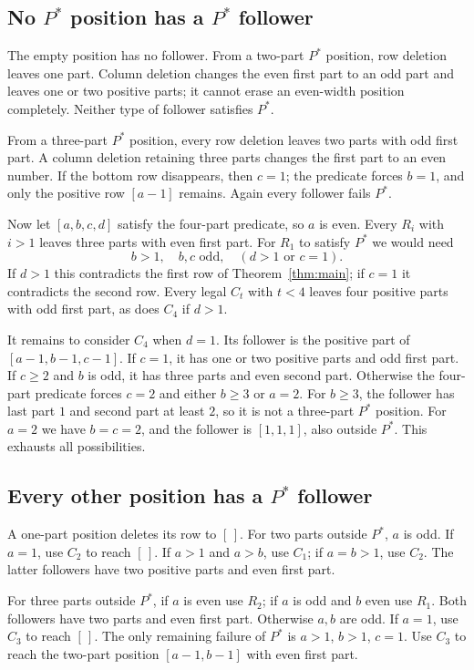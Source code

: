 \documentclass[11pt]{article}
\begin{document}
\subsection{No $P^*$ position has a $P^*$ follower}
The empty position has no follower.
From a two-part $P^*$ position, row deletion leaves one part.
Column deletion changes the even first part to an odd part and leaves one
or two positive parts; it cannot erase an even-width position completely.
Neither type of follower satisfies $P^*$.

From a three-part $P^*$ position, every row deletion leaves two parts
with odd first part. A column deletion retaining three parts changes the
first part to an even number. If the bottom row disappears, then $c=1$;
the predicate forces $b=1$, and only the positive row $[a-1]$ remains.
Again every follower fails $P^*$.

Now let $[a,b,c,d]$ satisfy the four-part predicate, so $a$ is even.
Every $R_i$ with $i>1$ leaves three parts with even first part.
For $R_1$ to satisfy $P^*$ we would need
\[
 b>1,\quad b,c\text{ odd},\quad (d>1\text{ or }c=1).
\]
If $d>1$ this contradicts the first row of Theorem~\ref{thm:main};
if $c=1$ it contradicts the second row.
Every legal $C_t$ with $t<4$ leaves four positive parts with odd first
part, as does $C_4$ if $d>1$.

It remains to consider $C_4$ when $d=1$.
Its follower is the positive part of $[a-1,b-1,c-1]$.
If $c=1$, it has one or two positive parts and odd first part.
If $c\ge2$ and $b$ is odd, it has three parts and even second part.
Otherwise the four-part predicate forces $c=2$ and either $b\ge3$ or
$a=2$. For $b\ge3$, the follower has last part $1$ and second part
at least $2$, so it is not a three-part $P^*$ position.
For $a=2$ we have $b=c=2$, and the follower is $[1,1,1]$,
also outside $P^*$.
This exhausts all possibilities.

\subsection{Every other position has a $P^*$ follower}
A one-part position deletes its row to $[\,]$.
For two parts outside $P^*$, $a$ is odd.
If $a=1$, use $C_2$ to reach $[\,]$.
If $a>1$ and $a>b$, use $C_1$; if $a=b>1$, use $C_2$.
The latter followers have two positive parts and even first part.

For three parts outside $P^*$, if $a$ is even use $R_2$;
if $a$ is odd and $b$ even use $R_1$.
Both followers have two parts and even first part.
Otherwise $a,b$ are odd.
If $a=1$, use $C_3$ to reach $[\,]$.
The only remaining failure of $P^*$ is $a>1$, $b>1$, $c=1$.
Use $C_3$ to reach the two-part position $[a-1,b-1]$ with even first part.
\end{document}
